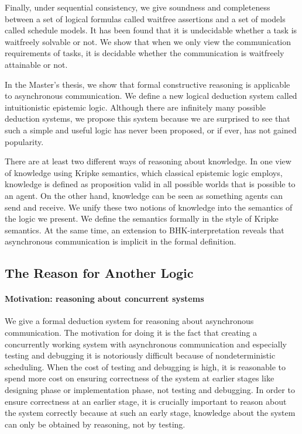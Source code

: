 Finally, under sequential consistency, we give soundness and completeness between
 a set of logical formulas called waitfree assertions and a set of models called 
schedule models.
 It has been found that it is undecidable whether a task is waitfreely solvable or not.
 We show that when we only view the communication requirements of tasks,
 it is decidable whether the communication is waitfreely attainable or not.


In the Master's thesis, we show that
formal constructive reasoning is
applicable to asynchronous communication.
We define a new logical deduction system called intuitionistic epistemic logic.
Although there are infinitely many possible deduction systems,
we propose this system because 
we are surprised to see that such a simple and useful logic has never been
proposed, or if ever, has not gained popularity.

There are at least two different ways of reasoning about knowledge.
In one view of knowledge using Kripke semantics,
which classical epistemic logic employs,
knowledge is defined as proposition valid in all possible worlds
that is possible to an agent.
On the other hand, knowledge can be seen as something agents can send and receive.
We unify these two notions of knowledge into the semantics of the logic we present.
We define the semantics formally in the style of Kripke semantics.
At the same time, 
an extension to BHK-interpretation reveals that asynchronous
communication is implicit in the formal definition.

\subsection{The Reason for Another Logic}

\paragraph{Motivation: reasoning about concurrent systems}
We give a formal deduction system for reasoning about
asynchronous communication.
The motivation for doing it is
the fact that creating a concurrently
working system with asynchronous communication 
and especially testing and debugging it is
notoriously difficult 
because of nondeterministic scheduling.
When the cost of testing and debugging is high,
it is reasonable to
spend more cost on ensuring correctness of the system
at earlier stages like designing phase or implementation phase, not testing and debugging.
In order to ensure correctness at an earlier stage,
it is crucially important to reason about the system correctly because
at such an early stage, knowledge about the system can only be obtained by reasoning,
not by testing.

